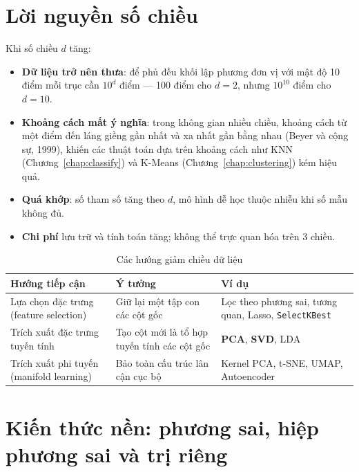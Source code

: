 \section{Lời nguyền số chiều}

Khi số chiều $d$ tăng:
\begin{itemize}
    \item \textbf{Dữ liệu trở nên thưa}: để phủ đều khối lập phương đơn vị với mật độ 10 điểm mỗi trục cần $10^d$ điểm --- 100 điểm cho $d = 2$, nhưng $10^{10}$ điểm cho $d = 10$.
    \item \textbf{Khoảng cách mất ý nghĩa}: trong không gian nhiều chiều, khoảng cách từ một điểm đến láng giềng gần nhất và xa nhất gần bằng nhau (Beyer và cộng sự, 1999), khiến các thuật toán dựa trên khoảng cách như KNN (Chương~\ref{chap:classify}) và K-Means (Chương~\ref{chap:clustering}) kém hiệu quả.
    \item \textbf{Quá khớp}: số tham số tăng theo $d$, mô hình dễ học thuộc nhiễu khi số mẫu không đủ.
    \item \textbf{Chi phí} lưu trữ và tính toán tăng; không thể trực quan hóa trên 3 chiều.
\end{itemize}

\begin{table}[H]
\centering
\begin{tabular}{|p{3.6cm}|p{5.2cm}|p{4.2cm}|}
\hline
\textbf{Hướng tiếp cận} & \textbf{Ý tưởng} & \textbf{Ví dụ} \\
\hline
Lựa chọn đặc trưng (feature selection) & Giữ lại một tập con các cột gốc & Lọc theo phương sai, tương quan, Lasso, \texttt{SelectKBest} \\ \hline
Trích xuất đặc trưng tuyến tính & Tạo cột mới là tổ hợp tuyến tính các cột gốc & \textbf{PCA}, \textbf{SVD}, LDA \\ \hline
Trích xuất phi tuyến (manifold learning) & Bảo toàn cấu trúc lân cận cục bộ & Kernel PCA, t-SNE, UMAP, Autoencoder \\ \hline
\end{tabular}
\caption{Các hướng giảm chiều dữ liệu}
\end{table}

\section{Kiến thức nền: phương sai, hiệp phương sai và trị riêng}
\label{sec:linalg-review}

